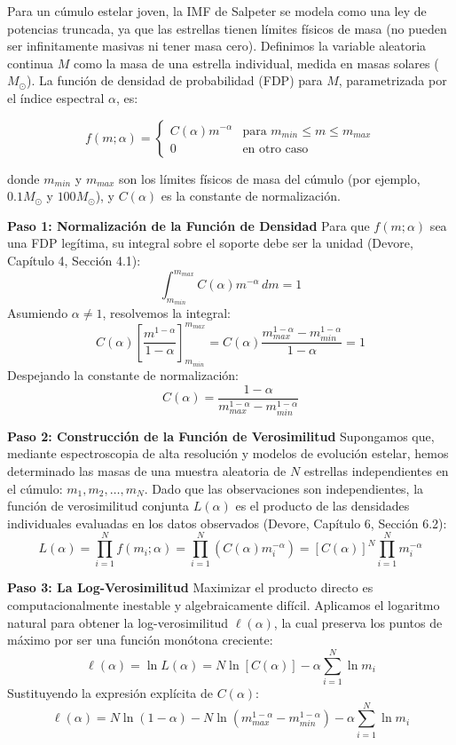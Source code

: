 Para un cúmulo estelar joven, la IMF de Salpeter se modela como una ley de potencias truncada, ya que las estrellas tienen límites físicos de masa (no pueden ser infinitamente masivas ni tener masa cero). Definimos la variable aleatoria continua $M$ como la masa de una estrella individual, medida en masas solares ($M_\odot$). La función de densidad de probabilidad (FDP) para $M$, parametrizada por el índice espectral $\alpha$, es:

$$
f(m; \alpha) = 
\begin{cases} 
C(\alpha) m^{-\alpha} & \text{para } m_{min} \le m \le m_{max} \\
0 & \text{en otro caso}
\end{cases}
$$

donde $m_{min}$ y $m_{max}$ son los límites físicos de masa del cúmulo (por ejemplo, $0.1 M_\odot$ y $100 M_\odot$), y $C(\alpha)$ es la constante de normalización.

\textbf{Paso 1: Normalización de la Función de Densidad}
Para que $f(m; \alpha)$ sea una FDP legítima, su integral sobre el soporte debe ser la unidad (Devore, Capítulo 4, Sección 4.1):
$$ \int_{m_{min}}^{m_{max}} C(\alpha) m^{-\alpha} \, dm = 1 $$
Asumiendo $\alpha \neq 1$, resolvemos la integral:
$$ C(\alpha) \left[ \frac{m^{1-\alpha}}{1-\alpha} \right]_{m_{min}}^{m_{max}} = C(\alpha) \frac{m_{max}^{1-\alpha} - m_{min}^{1-\alpha}}{1-\alpha} = 1 $$
Despejando la constante de normalización:
$$ C(\alpha) = \frac{1-\alpha}{m_{max}^{1-\alpha} - m_{min}^{1-\alpha}} $$

\textbf{Paso 2: Construcción de la Función de Verosimilitud}
Supongamos que, mediante espectroscopia de alta resolución y modelos de evolución estelar, hemos determinado las masas de una muestra aleatoria de $N$ estrellas independientes en el cúmulo: $m_1, m_2, \dots, m_N$. Dado que las observaciones son independientes, la función de verosimilitud conjunta $L(\alpha)$ es el producto de las densidades individuales evaluadas en los datos observados (Devore, Capítulo 6, Sección 6.2):
$$ L(\alpha) = \prod_{i=1}^{N} f(m_i; \alpha) = \prod_{i=1}^{N} \left( C(\alpha) m_i^{-\alpha} \right) = [C(\alpha)]^N \prod_{i=1}^{N} m_i^{-\alpha} $$

\textbf{Paso 3: La Log-Verosimilitud}
Maximizar el producto directo es computacionalmente inestable y algebraicamente difícil. Aplicamos el logaritmo natural para obtener la log-verosimilitud $\ell(\alpha)$, la cual preserva los puntos de máximo por ser una función monótona creciente:
$$ \ell(\alpha) = \ln L(\alpha) = N \ln[C(\alpha)] - \alpha \sum_{i=1}^{N} \ln m_i $$
Sustituyendo la expresión explícita de $C(\alpha)$:
$$ \ell(\alpha) = N \ln(1-\alpha) - N \ln\left(m_{max}^{1-\alpha} - m_{min}^{1-\alpha}\right) - \alpha \sum_{i=1}^{N} \ln m_i $$

